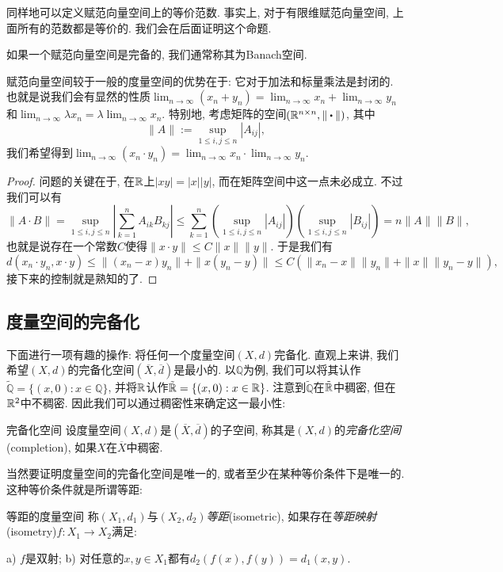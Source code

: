 同样地可以定义赋范向量空间上的等价范数. 事实上, 对于有限维赋范向量空间, 上面所有的范数都是等价的. 我们会在后面证明这个命题. 

如果一个赋范向量空间是完备的, 我们通常称其为Banach空间. 

赋范向量空间较于一般的度量空间的优势在于: 它对于加法和标量乘法是封闭的. 也就是说我们会有显然的性质$\lim_{n\to \infty} (x_n+y_n) = \lim_{n\to \infty} x_n + \lim_{n\to \infty} y_n$和$\lim_{n\to \infty} \lambda x_n = \lambda \lim_{n\to \infty} x_n$. 特别地, 考虑矩阵的空间$(\R ^{n\times n},\| \bigcdot \|)$, 其中$$\| A \| := \sup_{1 \leq i,j \leq n} |A_{ij}|,$$
我们希望得到$\lim_{n\to \infty} (x_n \cdot y_n) = \lim_{n\to \infty} x_n \cdot \lim_{n\to \infty} y_n$. 
\begin{proof}
	问题的关键在于, 在$\mathbb{R}$上$|xy|=|x||y|$, 而在矩阵空间中这一点未必成立. 不过我们可以有$$\| A \cdot B \| = \sup_{1 \leq i,j \leq n} |\sum_{k=1}^{n}A_{ik}B_{kj}| \leq \sum_{k=1}^n (\sup_{1 \leq i,j \leq n} |A_{ij}|)(\sup_{1 \leq i,j \leq n} |B_{ij}|) = n\| A \| \| B \|,$$
	也就是说存在一个常数$C$使得$\| x\cdot y \| \leq C\| x \| \| y \|$. 于是我们有$$d(x_n \cdot y_n,x \cdot y) \leq \| (x_n-x)y_n \| 
		+ \| x(y_n-y) \| \leq C(\| x_n-x \| \| y_n \| 
		+ \| x \| \| y_n-y \|),$$
	接下来的控制就是熟知的了. 
\end{proof}

\subsection{度量空间的完备化}

下面进行一项有趣的操作: 将任何一个度量空间$(X,d)$完备化. 直观上来讲, 我们希望$(X,d)$的完备化空间$(\overline{X},\overline{d})$是最小的. 以$\mathbb{Q}$为例, 我们可以将其认作$\tilde{\mathbb{Q}}=\{ (x,0):x \in \mathbb{Q} \}$, 并将$\mathbb{R}$认作$\tilde{\mathbb{R}}=\{ (x,0):x \in \mathbb{R} \}$. 注意到$\tilde{\mathbb{Q}}$在$\tilde{\mathbb{R}}$中稠密, 但在$\mathbb{R} ^2$中不稠密. 因此我们可以通过稠密性来确定这一最小性:

\begin{definition}{完备化空间}
	设度量空间$(X,d)$是$(\overline{X},\overline{d})$的子空间, 称其是$(X,d)$的\textit{完备化空间}(completion), 如果$X$在$\overline{X}$中稠密. 
\end{definition}

当然要证明度量空间的完备化空间是唯一的, 或者至少在某种等价条件下是唯一的. 这种等价条件就是所谓等距: 

\begin{definition}{等距的度量空间}
	称$(X_1,d_1)$与$(X_2,d_2)$\textit{等距}(isometric), 如果存在\textit{等距映射}(isometry)$f:X_1 \to X_2$满足: 
	
	a) $f$是双射; \qquad b) 对任意的$x,y \in X_1$都有$d_2(f(x),f(y))=d_1(x,y)$. 
\end{definition}

